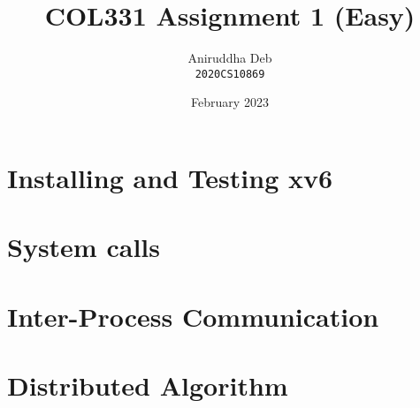 \documentclass[12pt]{article}
\title{\textbf{COL331 Assignment 1 (Easy)}}
\author{Aniruddha Deb \\ \texttt{2020CS10869}}
\date{February 2023}
\begin{document}
\maketitle

\section{Installing and Testing xv6}

\section{System calls}


\section{Inter-Process Communication}

\section{Distributed Algorithm}
\end{document}
